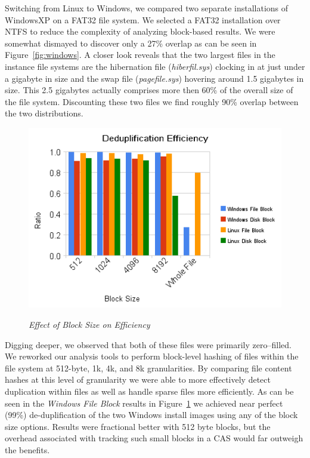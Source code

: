 Switching from Linux to Windows, we compared two separate installations
of WindowsXP on a FAT32 file system. 
We selected a FAT32 installation over NTFS to reduce the complexity of
analyzing block-based results.
We were somewhat dismayed to discover only a 27\% overlap as can be seen
in Figure~\ref{fig:windows}.
A closer look reveals that the two largest files in the instance file systems
are the hibernation file (\emph{hiberfil.sys}) clocking in at just under
a gigabyte in size and the swap file (\emph{pagefile.sys}) hovering around
1.5 gigabytes in size.  This 2.5 gigabytes actually comprises more then 60\%
of the overall size of the file system.  Discounting these two files we find
roughly 90\% overlap between the two distributions.

\begin{figure}[htbp]
\begin{centering}
\resizebox{\columnwidth}{!}
{\includegraphics{deduplification_efficiency}}
\small\itshape
\caption{\small\itshape Effect of Block Size on Efficiency}
\label{fig:block}
\end{centering}
\end{figure}

Digging deeper, we observed that both of these files were primarily 
zero--filled.
We reworked our analysis tools to perform block-level hashing of files
within the file system at 512-byte, 1k, 4k, and 8k granularities.
By comparing file content hashes at this level of granularity we were
able to more effectively detect duplication within files as well as 
handle sparse files more efficiently.  As can be seen in the 
\emph{Windows File Block} results in Figure~\ref{fig:block} we achieved near
perfect (99\%) de-duplification of the two Windows install images using
any of the block size options.  Results were fractional better with 512
byte blocks, but the overhead associated with tracking such small blocks
in a CAS would far outweigh the benefits.

